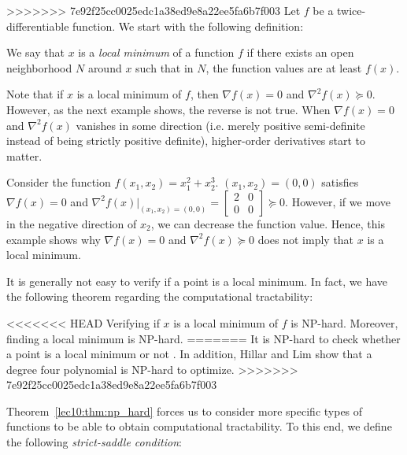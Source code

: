 >>>>>>> 7e92f25cc0025edc1a38ed9e8a22ee5fa6b7f003
Let $f$ be a twice-differentiable function. We start with the following definition:
\begin{definition} 
We say that $x$ is a \textit{local minimum} of a function $f$ if there exists an open neighborhood $N$ around $x$ such that in $N$, the function values are at least $f(x)$.
\end{definition}

Note that if $x$ is a local minimum of $f$, then $\nabla f(x) = 0$ and $\nabla^2 f(x) \succeq 0$. However, as the next example shows, the reverse is not true. When $\nabla f(x) = 0$ and $\nabla^2 f(x)$ vanishes in some direction (i.e. merely positive semi-definite instead of being strictly positive definite), higher-order derivatives start to matter.

\begin{example}
\label{lec10:ex:counterexample}
Consider the function $f(x_1, x_2) = x_1^2 + x_2^3$. $(x_1, x_2) = (0, 0)$ satisfies $\nabla f(x) = 0$ and $\nabla^2 f(x)|_{(x_1, x_2) = (0, 0)} = \begin{bmatrix} 2 & 0 \\
0 & 0\end{bmatrix} \succeq 0$. However, if we move in the negative direction of $x_2$, we can decrease the function value. Hence, this example shows why $\nabla f(x) = 0$ and $\nabla^2 f(x) \succeq 0$ does not imply that $x$ is a local minimum.
\end{example}

It is generally not easy to verify if a point is a local minimum. In fact, we have the following theorem regarding the computational tractability:
\begin{theorem}
\label{lec10:thm:np_hard}
<<<<<<< HEAD
Verifying if $x$ is a local minimum of $f$ is NP-hard.  Moreover, finding a local minimum is NP-hard.
=======
It is NP-hard to check whether a point is a local minimum or not \cite{murty1987}. In addition, Hillar and Lim \cite{hillar2013} show that a degree four polynomial is NP-hard to optimize.
>>>>>>> 7e92f25cc0025edc1a38ed9e8a22ee5fa6b7f003
\end{theorem}

Theorem~\ref{lec10:thm:np_hard} forces us to consider more specific types of functions to be able to obtain computational tractability. To this end, we define the following \textit{strict-saddle condition}:

